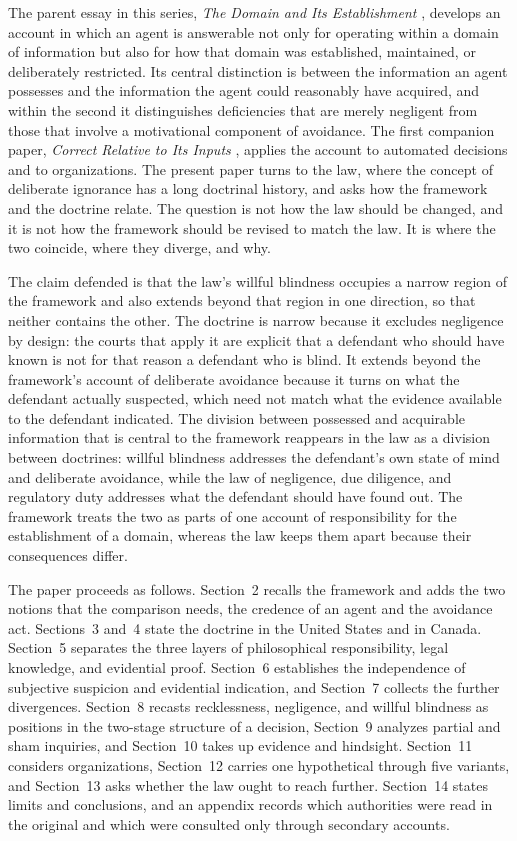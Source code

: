 \documentclass[11pt]{article}
\theoremstyle{plain}
\theoremstyle{definition}
\begin{document}
The parent essay in this series, \emph{The Domain and Its Establishment} \cite{flyxion2026domain}, develops an account in which an agent is answerable not only for operating within a domain of information but also for how that domain was established, maintained, or deliberately restricted. Its central distinction is between the information an agent possesses and the information the agent could reasonably have acquired, and within the second it distinguishes deficiencies that are merely negligent from those that involve a motivational component of avoidance. The first companion paper, \emph{Correct Relative to Its Inputs} \cite{flyxion2026inputs}, applies the account to automated decisions and to organizations. The present paper turns to the law, where the concept of deliberate ignorance has a long doctrinal history, and asks how the framework and the doctrine relate. The question is not how the law should be changed, and it is not how the framework should be revised to match the law. It is where the two coincide, where they diverge, and why.

The claim defended is that the law's willful blindness occupies a narrow region of the framework and also extends beyond that region in one direction, so that neither contains the other. The doctrine is narrow because it excludes negligence by design: the courts that apply it are explicit that a defendant who should have known is not for that reason a defendant who is blind. It extends beyond the framework's account of deliberate avoidance because it turns on what the defendant actually suspected, which need not match what the evidence available to the defendant indicated. The division between possessed and acquirable information that is central to the framework reappears in the law as a division between doctrines: willful blindness addresses the defendant's own state of mind and deliberate avoidance, while the law of negligence, due diligence, and regulatory duty addresses what the defendant should have found out. The framework treats the two as parts of one account of responsibility for the establishment of a domain, whereas the law keeps them apart because their consequences differ.

The paper proceeds as follows. Section~2 recalls the framework and adds the two notions that the comparison needs, the credence of an agent and the avoidance act. Sections~3 and~4 state the doctrine in the United States and in Canada. Section~5 separates the three layers of philosophical responsibility, legal knowledge, and evidential proof. Section~6 establishes the independence of subjective suspicion and evidential indication, and Section~7 collects the further divergences. Section~8 recasts recklessness, negligence, and willful blindness as positions in the two-stage structure of a decision, Section~9 analyzes partial and sham inquiries, and Section~10 takes up evidence and hindsight. Section~11 considers organizations, Section~12 carries one hypothetical through five variants, and Section~13 asks whether the law ought to reach further. Section~14 states limits and conclusions, and an appendix records which authorities were read in the original and which were consulted only through secondary accounts.
\end{document}
